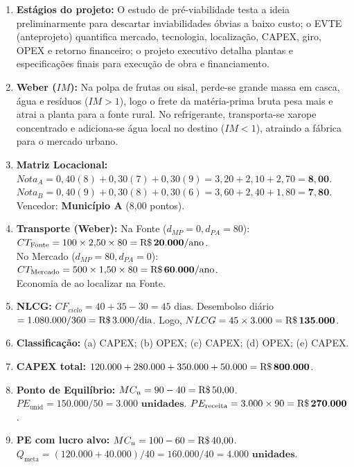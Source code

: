 \begin{boxGabarito}
\begin{enumerate}[leftmargin=1.5em, itemsep=4pt]
  \item \textbf{Estágios do projeto:} O estudo de pré-viabilidade testa a ideia preliminarmente para descartar inviabilidades óbvias a baixo custo; o EVTE (anteprojeto) quantifica mercado, tecnologia, localização, CAPEX, giro, OPEX e retorno financeiro; o projeto executivo detalha plantas e especificações finais para execução de obra e financiamento.
  \item \textbf{Weber ($IM$):} Na polpa de frutas ou sisal, perde-se grande massa em casca, água e resíduos ($IM > 1$), logo o frete da matéria-prima bruta pesa mais e atrai a planta para a fonte rural. No refrigerante, transporta-se xarope concentrado e adiciona-se água local no destino ($IM < 1$), atraindo a fábrica para o mercado urbano.
  \item \textbf{Matriz Locacional:}
  $Nota_A = 0{,}40(8) + 0{,}30(7) + 0{,}30(9) = 3{,}20 + 2{,}10 + 2{,}70 = \mathbf{8{,}00}$. \\
  $Nota_B = 0{,}40(9) + 0{,}30(8) + 0{,}30(6) = 3{,}60 + 2{,}40 + 1{,}80 = \mathbf{7{,}80}$. \\
  Vencedor: \textbf{Município A} (8,00 pontos).
  \item \textbf{Transporte (Weber):}
  Na Fonte ($d_{MP}=0, d_{PA}=80$): $CT_{\text{Fonte}} = 100 \times 2{,}50 \times 80 = \mathbf{\text{R\$\,}{20.000/\text{ano}}}$. \\
  No Mercado ($d_{MP}=80, d_{PA}=0$): $CT_{\text{Mercado}} = 500 \times 1{,}50 \times 80 = \mathbf{\text{R\$\,}{60.000/\text{ano}}}$. \\
  Economia de  ao localizar na Fonte.
  \item \textbf{NLCG:} $CF_{ciclo} = 40 + 35 - 30 = 45\text{ dias}$. Desembolso diário $= 1.080.000 / 360 = \text{R\$\,}{3.000/\text{dia}}$. Logo, $NLCG = 45 \times 3.000 = \mathbf{\text{R\$\,}{135.000}}$.
  \item \textbf{Classificação:} (a) CAPEX; (b) OPEX; (c) CAPEX; (d) OPEX; (e) CAPEX.
  \item \textbf{CAPEX total:} $120.000 + 280.000 + 350.000 + 50.000 = \mathbf{\text{R\$\,}{800.000}}$.
  \item \textbf{Ponto de Equilíbrio:} $MC_u = 90 - 40 = \text{R\$\,}{50{,}00}$. $PE_{\text{unid}} = 150.000 / 50 = \mathbf{3.000\text{ unidades}}$. $PE_{\text{receita}} = 3.000 \times 90 = \mathbf{\text{R\$\,}{270.000}}$.
  \item \textbf{PE com lucro alvo:} $MC_u = 100 - 60 = \text{R\$\,}{40{,}00}$. $Q_{\text{meta}} = (120.000 + 40.000) / 40 = 160.000 / 40 = \mathbf{4.000\text{ unidades}}$.

\end{enumerate}
\end{boxGabarito}

